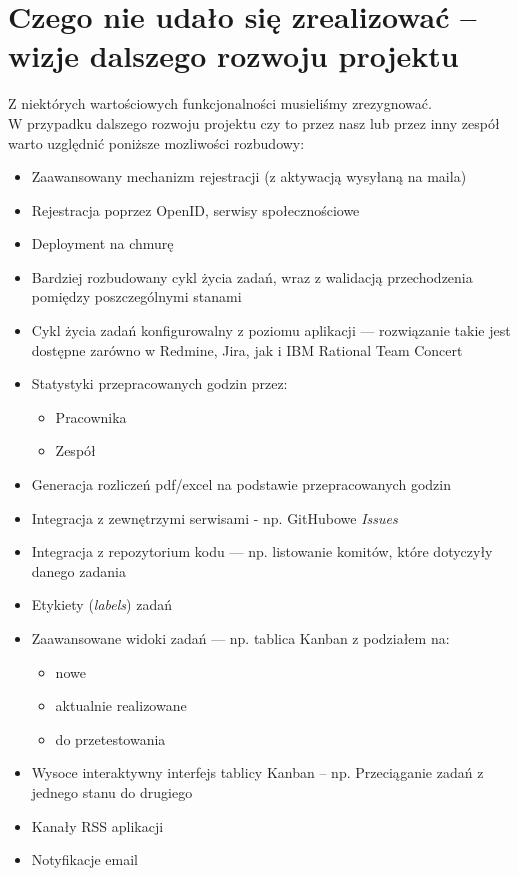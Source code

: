 \documentclass[a4paper,12pt,notitlepage]{mwrep}
\begin{document}
\section{Czego nie udało się zrealizować -- wizje dalszego rozwoju projektu}
Z niektórych wartościowych funkcjonalności musieliśmy zrezygnować.\\
W przypadku dalszego rozwoju projektu czy to przez nasz lub przez inny zespół
warto uzględnić poniższe mozliwości rozbudowy:
\begin{itemize}
	\item	Zaawansowany mechanizm rejestracji (z aktywacją wysyłaną na maila)
	\item	Rejestracja poprzez OpenID, serwisy społecznościowe
	\item	Deployment na chmurę
	\item	Bardziej rozbudowany cykl życia zadań, wraz z walidacją przechodzenia pomiędzy poszczególnymi stanami
	\item	Cykl życia zadań konfigurowalny z poziomu aplikacji ---
			rozwiązanie takie jest dostępne zarówno w Redmine, Jira, jak i IBM Rational Team Concert
	\item	Statystyki przepracowanych godzin przez:
			\begin{itemize}
				\item	Pracownika
				\item	Zespół
			\end{itemize}
	\item	Generacja rozliczeń pdf/excel na podstawie przepracowanych godzin
	\item	Integracja z zewnętrzymi serwisami - np. GitHubowe \emph{Issues}
	\item	Integracja z repozytorium kodu ---
			np. listowanie komitów, które dotyczyły danego zadania
	\item	Etykiety (\emph{labels}) zadań
	\item	Zaawansowane widoki zadań --- np. tablica Kanban z podziałem na:
			\begin{itemize}
				\item	nowe
				\item	aktualnie realizowane
				\item	do przetestowania
			\end{itemize}
	\item	Wysoce interaktywny interfejs tablicy Kanban -- np. Przeciąganie zadań z jednego stanu do drugiego
	\item	Kanały RSS aplikacji
	\item	Notyfikacje email
\end{itemize}
	
\end{document}
